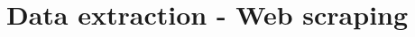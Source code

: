 \documentclass{standalone}
\begin{document}
\section[Web Scraping]{Data extraction - Web scraping}\label{scraping:scraping}

\end{document}
